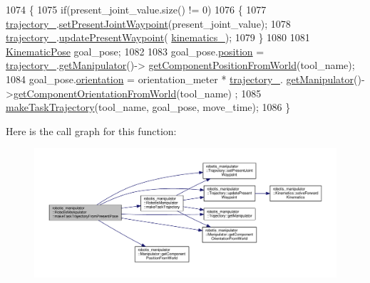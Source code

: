 \begin{DoxyCode}
1074 \{
1075   \textcolor{keywordflow}{if}(present\_joint\_value.size() != 0)
1076   \{
1077     \hyperlink{classrobotis__manipulator_1_1_robotis_manipulator_a992d2c7221bcaab8e9a688d12728d738}{trajectory\_}.\hyperlink{classrobotis__manipulator_1_1_trajectory_a58b1d4fb60f7e3ed9150d312766debc1}{setPresentJointWaypoint}(present\_joint\_value);
1078     \hyperlink{classrobotis__manipulator_1_1_robotis_manipulator_a992d2c7221bcaab8e9a688d12728d738}{trajectory\_}.\hyperlink{classrobotis__manipulator_1_1_trajectory_a05e95f1473723592130f63321664fb0c}{updatePresentWaypoint}(
      \hyperlink{classrobotis__manipulator_1_1_robotis_manipulator_a9a37fd068504dfe5fab346884790fc8f}{kinematics\_});
1079   \}
1080 
1081   \hyperlink{structrobotis__manipulator_1_1_kinematic_pose}{KinematicPose} goal\_pose;
1082 
1083   goal\_pose.\hyperlink{structrobotis__manipulator_1_1_kinematic_pose_a8700e7ae2388242cf540e884d52fd97a}{position} = \hyperlink{classrobotis__manipulator_1_1_robotis_manipulator_a992d2c7221bcaab8e9a688d12728d738}{trajectory\_}.\hyperlink{classrobotis__manipulator_1_1_trajectory_ae5276de42edf154de107c1f194f6b322}{getManipulator}()->
      \hyperlink{classrobotis__manipulator_1_1_manipulator_a04b2efdf66bc0e4bd04dc9aafd9f2d47}{getComponentPositionFromWorld}(tool\_name);
1084   goal\_pose.\hyperlink{structrobotis__manipulator_1_1_kinematic_pose_a0506da3cc344d21656fdd1befdd7fa27}{orientation} = orientation\_meter * \hyperlink{classrobotis__manipulator_1_1_robotis_manipulator_a992d2c7221bcaab8e9a688d12728d738}{trajectory\_}.
      \hyperlink{classrobotis__manipulator_1_1_trajectory_ae5276de42edf154de107c1f194f6b322}{getManipulator}()->\hyperlink{classrobotis__manipulator_1_1_manipulator_a9228f1f4b7fd627da2a618b79b2f0c0b}{getComponentOrientationFromWorld}(tool\_name)
      ;
1085   \hyperlink{classrobotis__manipulator_1_1_robotis_manipulator_af99e51e771170748507ac7c750b515da}{makeTaskTrajectory}(tool\_name, goal\_pose, move\_time);
1086 \}
\end{DoxyCode}


Here is the call graph for this function\+:\nopagebreak
\begin{figure}[H]
\begin{center}
\leavevmode
\includegraphics[width=350pt]{classrobotis__manipulator_1_1_robotis_manipulator_a09bb31cb32445db61006ae73e05c4d81_cgraph}
\end{center}
\end{figure}


